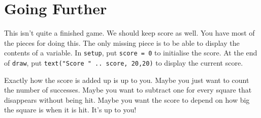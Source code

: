 \documentclass[
  xhtml,%
  use filename%
]{internet}
\begin{document}
\section{Going Further}

This isn't quite a finished game.
We should keep score as well.
You have most of the pieces for doing this.
The only missing piece is to be able to display the contents of a variable.
In \verb+setup+, put \verb+score = 0+ to initialise the score.
At the end of \verb+draw+, put \verb+text("Score " .. score, 20,20)+ to display the current score.

Exactly how the score is added up is up to you.
Maybe you just want to count the number of successes.
Maybe you want to subtract one for every square that disappears without being hit.
Maybe you want the score to depend on how big the square is when it is hit.
It's up to you!
                
\end{document}

